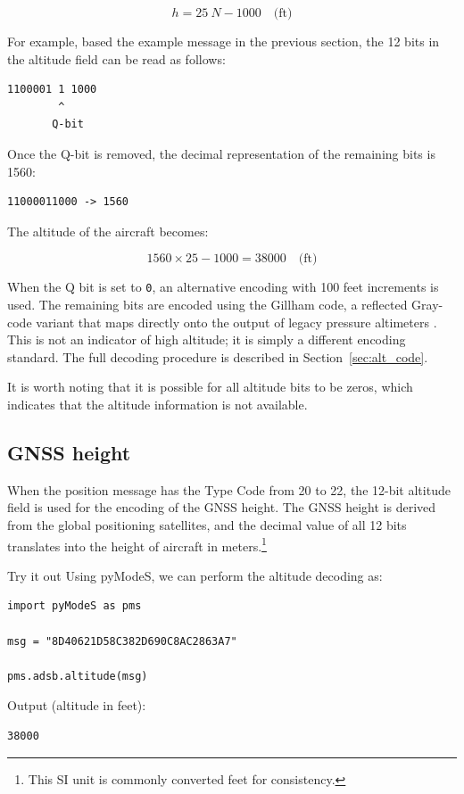 \begin{equation}
  h = 25 ~ N - 1000 \quad \text{(ft)}
\end{equation}

For example, based the example message in the previous section, the 12 bits in the altitude field can be read as follows:

\begin{verbatim}
1100001 1 1000
        ^
       Q-bit
\end{verbatim}

Once the Q-bit is removed, the decimal representation of the remaining bits is 1560:

\begin{verbatim}
11000011000 -> 1560
\end{verbatim}

The altitude of the aircraft becomes:

\begin{equation}
1560 \times 25 - 1000 = 38000 \quad \text{(ft)}
\end{equation}

When the Q bit is set to \texttt{0}, an alternative encoding with 100 feet increments is used. The remaining bits are encoded using the Gillham code, a reflected Gray-code variant that maps directly onto the output of legacy pressure altimeters \cite{doran2007}. This is not an indicator of high altitude; it is simply a different encoding standard. The full decoding procedure is described in Section~\ref{sec:alt_code}.

It is worth noting that it is possible for all altitude bits to be zeros, which indicates that the altitude information is not available.


\subsection{GNSS height}

When the position message has the Type Code from 20 to 22, the 12-bit altitude field is used for the encoding of the GNSS height. The GNSS height is derived from the global positioning satellites, and the decimal value of all 12 bits translates into the height of aircraft in meters.\footnote{This SI unit is commonly converted feet for consistency.}

\begin{notebox}{Try it out}
Using pyModeS, we can perform the altitude decoding as: 

\begin{verbatim}
import pyModeS as pms

msg = "8D40621D58C382D690C8AC2863A7"

pms.adsb.altitude(msg)
\end{verbatim}

Output (altitude in feet): 

\begin{verbatim}
38000
\end{verbatim}
\end{notebox}



